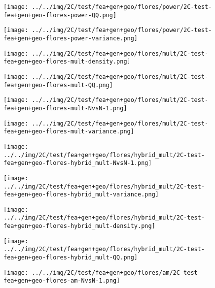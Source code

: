 \begin{figure}[H]
\centering	\texttt{[image: ../../img/2C/test/fea+gen+geo/flores/power/2C-test-fea+gen+geo-flores-power-QQ.png]}
\end{figure}
\begin{figure}[H]
\centering	\texttt{[image: ../../img/2C/test/fea+gen+geo/flores/power/2C-test-fea+gen+geo-flores-power-variance.png]}
\end{figure}
\begin{figure}[H]
\centering	\texttt{[image: ../../img/2C/test/fea+gen+geo/flores/mult/2C-test-fea+gen+geo-flores-mult-density.png]}
\end{figure}
\begin{figure}[H]
\centering	\texttt{[image: ../../img/2C/test/fea+gen+geo/flores/mult/2C-test-fea+gen+geo-flores-mult-QQ.png]}
\end{figure}
\begin{figure}[H]
\centering	\texttt{[image: ../../img/2C/test/fea+gen+geo/flores/mult/2C-test-fea+gen+geo-flores-mult-NvsN-1.png]}
\end{figure}
\begin{figure}[H]
\centering	\texttt{[image: ../../img/2C/test/fea+gen+geo/flores/mult/2C-test-fea+gen+geo-flores-mult-variance.png]}
\end{figure}
\begin{figure}[H]
\centering	\texttt{[image: ../../img/2C/test/fea+gen+geo/flores/hybrid\_mult/2C-test-fea+gen+geo-flores-hybrid\_mult-NvsN-1.png]}
\end{figure}
\begin{figure}[H]
\centering	\texttt{[image: ../../img/2C/test/fea+gen+geo/flores/hybrid\_mult/2C-test-fea+gen+geo-flores-hybrid\_mult-variance.png]}
\end{figure}
\begin{figure}[H]
\centering	\texttt{[image: ../../img/2C/test/fea+gen+geo/flores/hybrid\_mult/2C-test-fea+gen+geo-flores-hybrid\_mult-density.png]}
\end{figure}
\begin{figure}[H]
\centering	\texttt{[image: ../../img/2C/test/fea+gen+geo/flores/hybrid\_mult/2C-test-fea+gen+geo-flores-hybrid\_mult-QQ.png]}
\end{figure}
\begin{figure}[H]
\centering	\texttt{[image: ../../img/2C/test/fea+gen+geo/flores/am/2C-test-fea+gen+geo-flores-am-NvsN-1.png]}
\end{figure}
